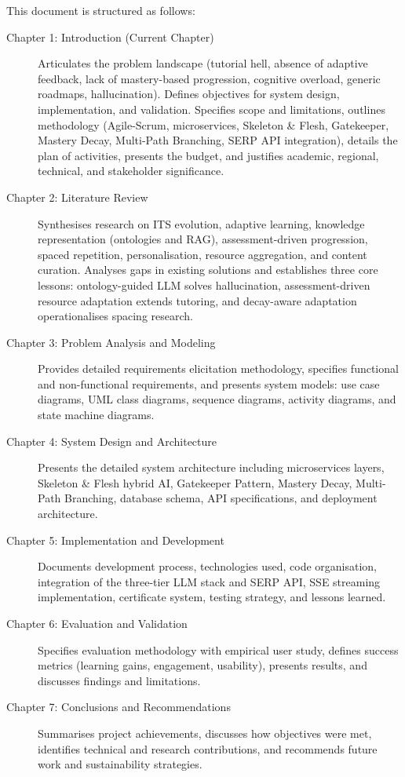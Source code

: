 This document is structured as follows:

\begin{description}
    \item[Chapter 1: Introduction (Current Chapter)] Articulates the problem landscape (tutorial hell, absence of adaptive feedback, lack of mastery-based progression, cognitive overload, generic roadmaps, hallucination). Defines objectives for system design, implementation, and validation. Specifies scope and limitations, outlines methodology (Agile-Scrum, microservices, Skeleton \& Flesh, Gatekeeper, Mastery Decay, Multi-Path Branching, SERP API integration), details the plan of activities, presents the budget, and justifies academic, regional, technical, and stakeholder significance.
    \item[Chapter 2: Literature Review] Synthesises research on ITS evolution, adaptive learning, knowledge representation (ontologies and RAG), assessment-driven progression, spaced repetition, personalisation, resource aggregation, and content curation. Analyses gaps in existing solutions and establishes three core lessons: ontology-guided LLM solves hallucination, assessment-driven resource adaptation extends tutoring, and decay-aware adaptation operationalises spacing research.
    \item[Chapter 3: Problem Analysis and Modeling] Provides detailed requirements elicitation methodology, specifies functional and non-functional requirements, and presents system models: use case diagrams, UML class diagrams, sequence diagrams, activity diagrams, and state machine diagrams.
    \item[Chapter 4: System Design and Architecture] Presents the detailed system architecture including microservices layers, Skeleton \& Flesh hybrid AI, Gatekeeper Pattern, Mastery Decay, Multi-Path Branching, database schema, API specifications, and deployment architecture.
    \item[Chapter 5: Implementation and Development] Documents development process, technologies used, code organisation, integration of the three-tier LLM stack and SERP API, SSE streaming implementation, certificate system, testing strategy, and lessons learned.
    \item[Chapter 6: Evaluation and Validation] Specifies evaluation methodology with empirical user study, defines success metrics (learning gains, engagement, usability), presents results, and discusses findings and limitations.
    \item[Chapter 7: Conclusions and Recommendations] Summarises project achievements, discusses how objectives were met, identifies technical and research contributions, and recommends future work and sustainability strategies.
\end{description}
